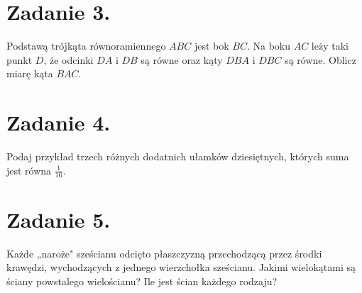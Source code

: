\documentclass[10pt]{article}
\begin{document}
\section*{Zadanie 3.}
Podstawą trójkąta równoramiennego \(A B C\) jest bok \(B C\). Na boku \(A C\) leży taki punkt \(D\), że odcinki \(D A\) i \(D B\) są równe oraz kąty \(D B A\) i \(D B C\) są równe. Oblicz miarę kąta \(B A C\).

\section*{Zadanie 4.}
Podaj przykład trzech różnych dodatnich ułamków dziesiętnych, których suma jest równa \(\frac{1}{16}\).

\section*{Zadanie 5.}
Każde „naroże" sześcianu odcięto płaszczyzną przechodzącą przez środki krawędzi, wychodzących z jednego wierzchołka sześcianu. Jakimi wielokątami są ściany powstalego wielościanu? Ile jest ścian każdego rodzaju?
\end{document}
